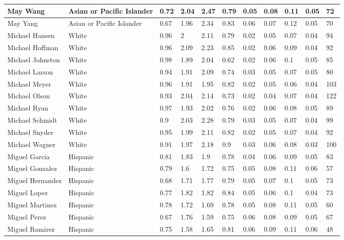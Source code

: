 \begin{table}[!ht]
\begin{tabular}{|l|l|l|l|l|l|l|l|l|l|l|}
        May Wang & Asian or Pacific Islander & 0.72 & 2.04 & 2.47 & 0.79 & 0.05 & 0.08 & 0.11 & 0.05 & 72 \\ \hline
        May Yang & Asian or Pacific Islander & 0.67 & 1.96 & 2.34 & 0.83 & 0.06 & 0.07 & 0.12 & 0.05 & 70 \\ \hline
        Michael Hansen & White & 0.96 & 2 & 2.11 & 0.79 & 0.02 & 0.05 & 0.07 & 0.04 & 94 \\ \hline
        Michael Hoffman & White & 0.96 & 2.09 & 2.23 & 0.85 & 0.02 & 0.06 & 0.09 & 0.04 & 92 \\ \hline
        Michael Johnston & White & 0.98 & 1.89 & 2.04 & 0.62 & 0.02 & 0.06 & 0.1 & 0.05 & 85 \\ \hline
        Michael Larson & White & 0.94 & 1.91 & 2.09 & 0.74 & 0.03 & 0.05 & 0.07 & 0.05 & 80 \\ \hline
        Michael Meyer & White & 0.96 & 1.91 & 1.95 & 0.82 & 0.02 & 0.05 & 0.06 & 0.04 & 103 \\ \hline
        Michael Olson & White & 0.93 & 2.04 & 2.14 & 0.73 & 0.02 & 0.04 & 0.07 & 0.04 & 122 \\ \hline
        Michael Ryan & White & 0.97 & 1.93 & 2.02 & 0.76 & 0.02 & 0.06 & 0.08 & 0.05 & 89 \\ \hline
        Michael Schmidt & White & 0.9 & 2.03 & 2.28 & 0.79 & 0.03 & 0.05 & 0.07 & 0.04 & 99 \\ \hline
        Michael Snyder & White & 0.95 & 1.99 & 2.11 & 0.82 & 0.02 & 0.05 & 0.07 & 0.04 & 92 \\ \hline
        Michael Wagner & White & 0.91 & 1.97 & 2.18 & 0.9 & 0.03 & 0.06 & 0.08 & 0.03 & 100 \\ \hline
        Miguel Garcia & Hispanic & 0.81 & 1.83 & 1.9 & 0.78 & 0.04 & 0.06 & 0.09 & 0.05 & 83 \\ \hline
        Miguel Gonzalez & Hispanic & 0.79 & 1.6 & 1.72 & 0.75 & 0.05 & 0.08 & 0.11 & 0.06 & 57 \\ \hline
        Miguel Hernandez & Hispanic & 0.68 & 1.71 & 1.77 & 0.79 & 0.05 & 0.07 & 0.1 & 0.05 & 73 \\ \hline
        Miguel Lopez & Hispanic & 0.77 & 1.82 & 1.82 & 0.84 & 0.05 & 0.06 & 0.1 & 0.04 & 73 \\ \hline
        Miguel Martinez & Hispanic & 0.78 & 1.72 & 1.69 & 0.78 & 0.05 & 0.08 & 0.11 & 0.05 & 60 \\ \hline
        Miguel Perez & Hispanic & 0.67 & 1.76 & 1.59 & 0.75 & 0.06 & 0.08 & 0.09 & 0.05 & 67 \\ \hline
        Miguel Ramirez & Hispanic & 0.75 & 1.58 & 1.65 & 0.81 & 0.06 & 0.09 & 0.11 & 0.06 & 48 \\ \hline

\end{tabular}
\end{table}
